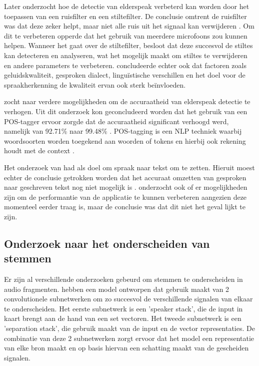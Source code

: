 Later onderzocht \textcite{Daems2023} hoe de detectie van elderspeak verbeterd kan worden door het toepassen van een ruisfilter en een stiltefilter. De conclusie omtrent de ruisfilter was dat deze zeker helpt, maar niet alle ruis uit het signaal kan verwijderen \autocite{Daems2023}. Om dit te verbeteren opperde \textcite{Daems2023} dat het gebruik van meerdere microfoons zou kunnen helpen.
Wanneer het gaat over de stiltefilter, besloot \textcite{Daems2023} dat deze succesvol de stiltes kan detecteren en analyseren, wat het mogelijk maakt om stiltes te verwijderen en andere parameters te verbeteren. \textcite{Daems2023} concludeerde echter ook dat factoren zoals geluidskwaliteit, gesproken dialect, linguïstische verschillen en het doel voor de spraakherkenning de kwaliteit ervan ook sterk beïnvloeden.

\textcite{Branden2024} zocht naar verdere mogelijkheden om de accuraatheid van elderspeak detectie te verhogen. Uit dit onderzoek kon geconcludeerd worden dat het gebruik van een POS-tagger ervoor zorgde dat de accuraatheid significant verhoogd werd, namelijk van 92.71\% naar 99.48\% \autocite{Branden2024}. POS-tagging is een NLP techniek waarbij woordsoorten worden toegekend aan woorden of tokens en hierbij ook rekening houdt met de context \autocite{Branden2024}.

Het onderzoek van \textcite{Schryver2024} had als doel om spraak naar tekst om te zetten. Hieruit moest echter de conclusie getrokken worden dat het accuraat omzetten van gesproken naar geschreven tekst nog niet mogelijk is \autocite{Schryver2024}. \textcite{Schryver2024} onderzocht ook of er mogelijkheden zijn om de performantie van de applicatie te kunnen verbeteren aangezien deze momenteel eerder traag is, maar de conclusie was dat dit niet het geval lijkt te zijn.

\subsection{Onderzoek naar het onderscheiden van stemmen}

Er zijn al verschillende onderzoeken gebeurd om stemmen te onderscheiden in audio fragmenten. \textcite{Zeghidour2021} hebben een model ontworpen dat gebruik maakt van 2 convolutionele subnetwerken om zo succesvol de verschillende signalen van elkaar te onderscheiden. Het eerste subnetwerk is een 'speaker stack', die de input in kaart brengt aan de hand van een set vectoren. Het tweede subnetwerk is een 'separation stack', die gebruik maakt van de input en de vector representaties. De combinatie van deze 2 subnetwerken zorgt ervoor dat het model een representatie van elke bron maakt en op basis hiervan een schatting maakt van de gescheiden signalen. \autocite{Zeghidour2021}

